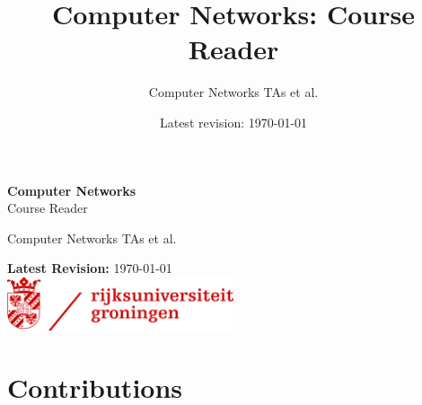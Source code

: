 \documentclass[12pt,a4paper,openany]{book}
\title{Computer Networks: Course Reader}
\author{Computer Networks TAs et al.}
\date{Latest revision: \today}
\theoremstyle{definition}
\theoremstyle{plain}
\begin{document}
\frontmatter
\begin{titlepage}
    \vspace*{\fill}
    \centering
    {\fontsize{40}{48}\selectfont\bfseries\sffamily Computer Networks}\\[0.5cm]
    {\fontsize{30}{36}\selectfont\sffamily Course Reader}

    \vspace{1.5cm}


    \vspace{2cm}

    {\fontsize{20}{24}\selectfont\sffamily Computer Networks TAs et al.}

    \vspace*{\fill}

    \centering

    {\fontsize{16}{19}\selectfont\sffamily\textbf{Latest Revision:} \today}\\[0.3cm]
    \vspace{0.5cm}
    \includegraphics[width=0.5\textwidth]{assets/rug.png}

    \vspace{1cm}
    
\end{titlepage}

\newpage
\thispagestyle{empty}
\mbox{}
\tableofcontents

\markboth{}{}


\mainmatter






\appendix


\backmatter
\listoffigures
\listoftables
\chapter*{Contributions}\label{sec:contributions}

\end{document}
